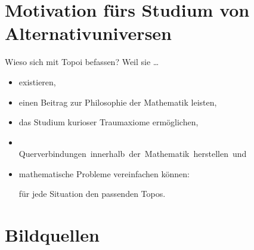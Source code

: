 \documentclass[12pt,compress,ngerman,utf8,t]{beamer}
\begin{document}
\section[Motivation]{Motivation fürs Studium von Alternativuniversen}


{
\begin{frame}{Wieso sich mit Topoi befassen?}
  Weil sie \ldots
  \begin{itemize}
    \item existieren,
    \item einen Beitrag zur Philosophie der Mathematik leisten,
    \item das Studium kurioser Traumaxiome ermöglichen,
    \item \ \\[-1.2em]\mbox{Querverbindungen innerhalb der Mathematik herstellen und}
    \item mathematische Probleme vereinfachen können:

    für jede Situation den passenden Topos.
  \end{itemize}
\end{frame}}


\appendix

\section{Bildquellen}
\end{document}
